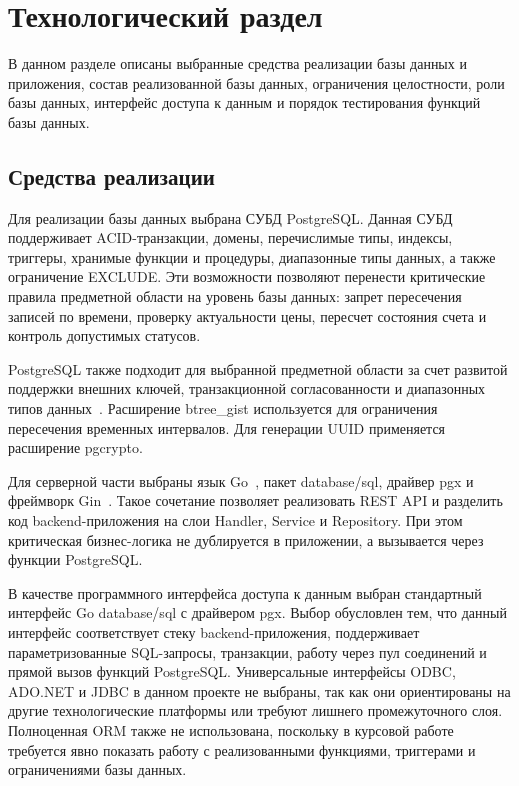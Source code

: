 \chapter{Технологический раздел}

В данном разделе описаны выбранные средства реализации базы данных и приложения, состав реализованной базы данных, ограничения целостности, роли базы данных, интерфейс доступа к данным и порядок тестирования функций базы данных.

\section{Средства реализации}

Для реализации базы данных выбрана СУБД PostgreSQL. Данная СУБД поддерживает ACID-транзакции, домены, перечислимые типы, индексы, триггеры, хранимые функции и процедуры, диапазонные типы данных, а также ограничение EXCLUDE. Эти возможности позволяют перенести критические правила предметной области на уровень базы данных: запрет пересечения записей по времени, проверку актуальности цены, пересчет состояния счета и контроль допустимых статусов.

PostgreSQL также подходит для выбранной предметной области за счет развитой поддержки внешних ключей, транзакционной согласованности и диапазонных типов данных~\cite{postgres_range}. Расширение btree\_gist используется для ограничения пересечения временных интервалов. Для генерации UUID применяется расширение pgcrypto.

Для серверной части выбраны язык Go~\cite{go_docs}, пакет database/sql, драйвер pgx и фреймворк Gin~\cite{gin_docs}. Такое сочетание позволяет реализовать REST API и разделить код backend-приложения на слои Handler, Service и Repository. При этом критическая бизнес-логика не дублируется в приложении, а вызывается через функции PostgreSQL.

В качестве программного интерфейса доступа к данным выбран стандартный интерфейс Go database/sql с драйвером pgx. Выбор обусловлен тем, что данный интерфейс соответствует стеку backend-приложения, поддерживает параметризованные SQL-запросы, транзакции, работу через пул соединений и прямой вызов функций PostgreSQL. Универсальные интерфейсы ODBC, ADO.NET и JDBC в данном проекте не выбраны, так как они ориентированы на другие технологические платформы или требуют лишнего промежуточного слоя. Полноценная ORM также не использована, поскольку в курсовой работе требуется явно показать работу с реализованными функциями, триггерами и ограничениями базы данных.

